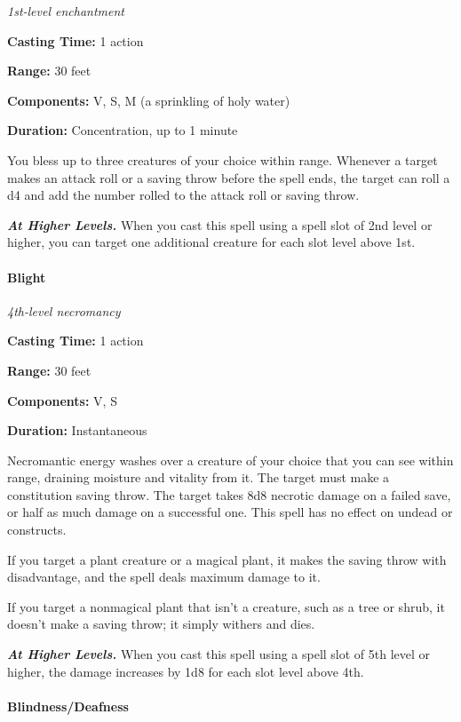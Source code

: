 \documentclass[
]{article}
\begin{document}
\emph{1st-level enchantment}

\textbf{Casting Time:} 1 action

\textbf{Range:} 30 feet

\textbf{Components:} V, S, M (a sprinkling of holy water)

\textbf{Duration:} Concentration, up to 1 minute

You bless up to three creatures of your choice within range. Whenever a
target makes an attack roll or a saving throw before the spell ends, the
target can roll a d4 and add the number rolled to the attack roll or
saving throw.

\emph{\textbf{At Higher Levels.}} When you cast this spell using a spell
slot of 2nd level or higher, you can target one additional creature for
each slot level above 1st.

\hypertarget{blight}{%
\paragraph{Blight}\label{blight}}

\emph{4th-level necromancy}

\textbf{Casting Time:} 1 action

\textbf{Range:} 30 feet

\textbf{Components:} V, S

\textbf{Duration:} Instantaneous

Necromantic energy washes over a creature of your choice that you can
see within range, draining moisture and vitality from it. The target
must make a constitution saving throw. The target takes 8d8 necrotic
damage on a failed save, or half as much damage on a successful one.
This spell has no effect on undead or constructs.

If you target a plant creature or a magical plant, it makes the saving
throw with disadvantage, and the spell deals maximum damage to it.

If you target a nonmagical plant that isn't a creature, such as a tree
or shrub, it doesn't make a saving throw; it simply withers and dies.

\emph{\textbf{At Higher Levels.}} When you cast this spell using a spell
slot of 5th level or higher, the damage increases by 1d8 for each slot
level above 4th.

\hypertarget{blindnessdeafness}{%
\paragraph{Blindness/Deafness}\label{blindnessdeafness}}
\end{document}
